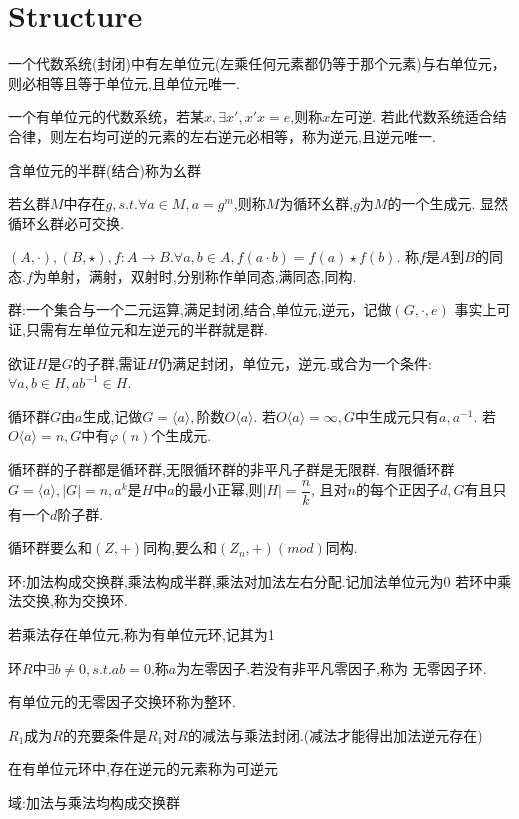 \section{Structure}
一个代数系统(封闭)中有左单位元(左乘任何元素都仍等于那个元素)与右单位元，则必相等且等于单位元,且单位元唯一.

一个有单位元的代数系统，若某$ x,\exists x', x'x=e$,则称$ x$左可逆.
若此代数系统适合结合律，则左右均可逆的元素的左右逆元必相等，称为逆元,且逆元唯一.

含单位元的半群(结合)称为幺群

若幺群$ M$中存在$ g,s.t.\forall a\in M, a=g^m$,则称$ M$为循环幺群,$ g$为$ M$的一个生成元.
显然循环幺群必可交换.

$ (A, \cdot), (B, \star),f:A \rightarrow B. \forall a,b \in A, f(a \cdot b)=f(a)\star f(b).$
称$ f$是$ A$到$ B$的同态.$ f$为单射，满射，双射时,分别称作单同态,满同态,同构.

群:一个集合与一个二元运算,满足封闭,结合,单位元,逆元，记做$ (G, \cdot, e)$
事实上可证,只需有左单位元和左逆元的半群就是群.

欲证$ H$是$ G$的子群,需证$ H$仍满足封闭，单位元，逆元.或合为一个条件:$ \forall a,b\in H, ab^{-1} \in H$.

循环群$ G$由$ a$生成,记做$ G=\langle a \rangle,$阶数$ O\langle a \rangle$.
若$ O \langle a \rangle = \infty, G$中生成元只有$ a,a^{-1}.$
若$ O \langle a \rangle = n ,G$中有$ \varphi(n)$个生成元.

循环群的子群都是循环群,无限循环群的非平凡子群是无限群.
有限循环群$ G=\langle a \rangle,|G|=n,a^k$是$ H$中$ a$的最小正幂,则$ |H| = \dfrac{n}{k}$,
且对$ n$的每个正因子$ d,G$有且只有一个$ d$阶子群.

循环群要么和$ (Z, +)$同构,要么和$ (Z_n, +)(mod)$同构.

环:加法构成交换群,乘法构成半群,乘法对加法左右分配.记加法单位元为0
若环中乘法交换,称为交换环.

若乘法存在单位元,称为有单位元环,记其为1

环$ R$中$\exists b\ne 0,s.t.ab=0$,称$ a$为左零因子.若没有非平凡零因子,称为
无零因子环.

有单位元的无零因子交换环称为整环.

$ R_1$成为$ R$的充要条件是$ R_1$对$ R$的减法与乘法封闭.(减法才能得出加法逆元存在)

在有单位元环中,存在逆元的元素称为可逆元

域:加法与乘法均构成交换群
\\

